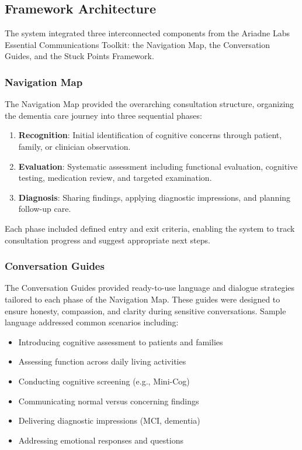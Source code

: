 \subsection{Framework Architecture}\label{sec:framework}

The system integrated three interconnected components from the Ariadne Labs Essential Communications Toolkit: the Navigation Map, the Conversation Guides, and the Stuck Points Framework.

\subsubsection{Navigation Map}

The Navigation Map provided the overarching consultation structure, organizing the dementia care journey into three sequential phases:

\begin{enumerate}
    \item \textbf{Recognition}: Initial identification of cognitive concerns through patient, family, or clinician observation.
    \item \textbf{Evaluation}: Systematic assessment including functional evaluation, cognitive testing, medication review, and targeted examination.
    \item \textbf{Diagnosis}: Sharing findings, applying diagnostic impressions, and planning follow-up care.
\end{enumerate}

Each phase included defined entry and exit criteria, enabling the system to track consultation progress and suggest appropriate next steps.

\subsubsection{Conversation Guides}

The Conversation Guides provided ready-to-use language and dialogue strategies tailored to each phase of the Navigation Map. These guides were designed to ensure honesty, compassion, and clarity during sensitive conversations. Sample language addressed common scenarios including:

\begin{itemize}
    \item Introducing cognitive assessment to patients and families
    \item Assessing function across daily living activities
    \item Conducting cognitive screening (e.g., Mini-Cog)
    \item Communicating normal versus concerning findings
    \item Delivering diagnostic impressions (MCI, dementia)
    \item Addressing emotional responses and questions
\end{itemize}

